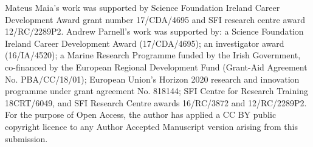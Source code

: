 \documentclass[aoas,preprint]{imsart}
\theoremstyle{plain}
\theoremstyle{definition}
\theoremstyle{remark}
\begin{document}
\begin{funding}
\small
    Mateus Maia's work was supported by Science Foundation Ireland Career Development Award grant number 17/CDA/4695 and SFI research centre award 12/RC/2289P2. Andrew Parnell's work was supported by: a Science Foundation Ireland Career Development Award (17/CDA/4695); an investigator award (16/IA/4520); a Marine Research Programme funded by the Irish Government, co-financed by the European Regional Development Fund (Grant-Aid Agreement No. PBA/CC/18/01); European Union's Horizon 2020 research and innovation programme under grant agreement No. 818144; SFI Centre for Research Training 18CRT/6049, and SFI Research Centre awards 16/RC/3872 and 12/RC/2289P2. For the purpose of Open Access, the author has applied a CC BY public copyright licence to any Author Accepted Manuscript version arising from this submission.
\end{funding}

\begin{supplement}
\end{supplement}
\begin{supplement}
\end{supplement}
\begin{supplement}
\end{supplement}
\begin{supplement}
\end{supplement}
\begin{supplement}
\end{supplement}

\renewcommand\thefigure{\thesection.\arabic{figure}}
\renewcommand\thetable{\thesection.\arabic{table}}
\end{document}
